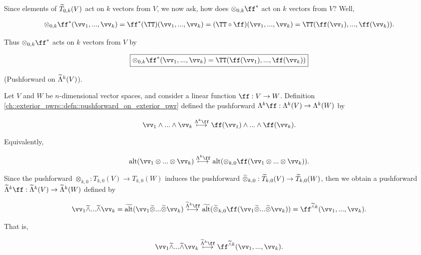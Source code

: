 \begin{deriv}
    Since elements of $\widetilde{T}_{0,k}(V)$ act on $k$ vectors from $V$, we now ask, how does $\otimes_{0, k} \ff^*$ act on $k$ vectors from $V$? Well,
    
    \begin{align*}
        \otimes_{0, k} \ff^*(\vv_1, ..., \vv_k) = \ff^*(\TT)(\vv_1, ..., \vv_k) = (\TT \circ \ff)(\vv_1, ..., \vv_k) = \TT(\ff(\vv_1), ..., \ff(\vv_k)).
    \end{align*}
    
    Thus $\otimes_{0, k} \ff^*$ acts on $k$ vectors from $V$ by
    
    \begin{align*}
        \boxed
        {
            \otimes_{0, k} \ff^*(\vv_1, ..., \vv_k) = \TT(\ff(\vv_1), ..., \ff(\vv_k))
        }
    \end{align*}
\end{deriv}

\begin{deriv}
    (Pushforward on $\widetilde{\Lambda}^k(V)$).
    
    Let $V$ and $W$ be $n$-dimensional vector spaces, and consider a linear function $\ff:V \rightarrow W$. Definition \ref{ch::exterior_pwrs::defn::pushforward_on_exterior_pwr} defined the pushforward $\Lambda^k \ff:\Lambda^k(V) \rightarrow \Lambda^k(W)$ by
    
    \begin{align*}
        \vv_1 \wedge ... \wedge \vv_k \overset{\Lambda^k \ff}{\longmapsto} \ff(\vv_1) \wedge ... \wedge \ff(\vv_k).
    \end{align*}
    
    Equivalently,
    
    \begin{align*}
        \alt(\vv_1 \otimes ... \otimes \vv_k) \overset{\Lambda^k \ff}{\longmapsto} \alt(\otimes_{k, 0} \ff(\vv_1 \otimes ... \otimes 
        \vv_k)).
    \end{align*}
    
    Since the pushforward $\otimes_{k, 0}:T_{k,0}(V) \rightarrow T_{k,0}(W)$ induces the pushforward $\widetilde{\otimes}_{k,0}:\widetilde{T}_{k,0}(V) \rightarrow \widetilde{T}_{k,0}(W)$, then we obtain a pushforward $\tLambda^k \ff:\tLambda^k(V) \rightarrow \tLambda^k(W)$ defined by
    
    \begin{align*}
        \vv_1 \twedge ... \twedge \vv_k = \talt(\vv_1 \totimes ... \totimes \vv_k) \overset{\tLambda^k \ff}{\longmapsto} \talt(\totimes_{k,0} \ff(\vv_1 \totimes ... \totimes \vv_k)) = \ff^{\twedge k}(\vv_1, ..., \vv_k).
    \end{align*}
    
    That is,
    
    \begin{align*}
        \vv_1 \twedge ... \twedge \vv_k \overset{\tLambda^k \ff}{\longmapsto} \ff^{\twedge k}(\vv_1, ..., \vv_k).
    \end{align*}
\end{deriv}

